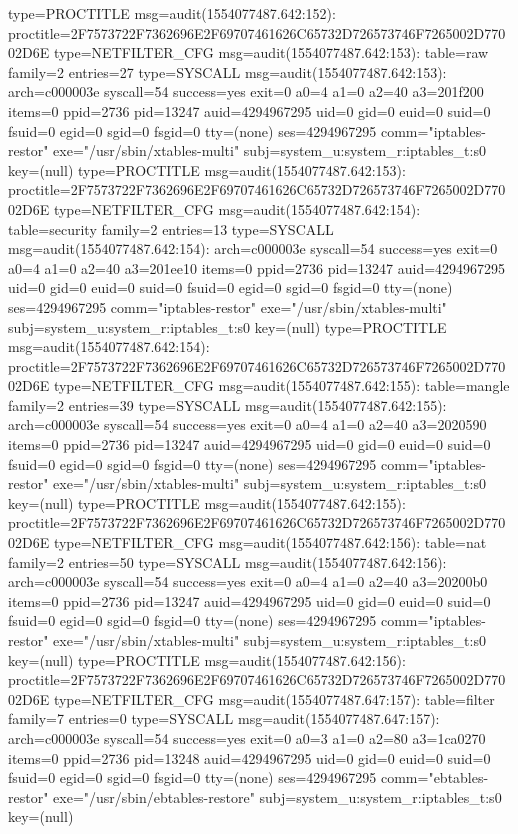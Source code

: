 \documentclass[]{report}
\newenvironment{Shaded}{}{}
\newcommand{\NormalTok}[1]{#1}
\begin{document}
\begin{Shaded}
\begin{Highlighting}[]
\NormalTok{type=PROCTITLE msg=audit(1554077487.642:152): proctitle=2F7573722F7362696E2F69707461626C65732D726573746F7265002D77002D6E}
\NormalTok{type=NETFILTER_CFG msg=audit(1554077487.642:153): table=raw family=2 entries=27}
\NormalTok{type=SYSCALL msg=audit(1554077487.642:153): arch=c000003e syscall=54 success=yes exit=0 a0=4 a1=0 a2=40 a3=201f200 items=0 ppid=2736 pid=13247 auid=4294967295 uid=0 gid=0 euid=0 suid=0 fsuid=0 egid=0 sgid=0 fsgid=0 tty=(none) ses=4294967295 comm="iptables-restor" exe="/usr/sbin/xtables-multi" subj=system_u:system_r:iptables_t:s0 key=(null)}
\NormalTok{type=PROCTITLE msg=audit(1554077487.642:153): proctitle=2F7573722F7362696E2F69707461626C65732D726573746F7265002D77002D6E}
\NormalTok{type=NETFILTER_CFG msg=audit(1554077487.642:154): table=security family=2 entries=13}
\NormalTok{type=SYSCALL msg=audit(1554077487.642:154): arch=c000003e syscall=54 success=yes exit=0 a0=4 a1=0 a2=40 a3=201ee10 items=0 ppid=2736 pid=13247 auid=4294967295 uid=0 gid=0 euid=0 suid=0 fsuid=0 egid=0 sgid=0 fsgid=0 tty=(none) ses=4294967295 comm="iptables-restor" exe="/usr/sbin/xtables-multi" subj=system_u:system_r:iptables_t:s0 key=(null)}
\NormalTok{type=PROCTITLE msg=audit(1554077487.642:154): proctitle=2F7573722F7362696E2F69707461626C65732D726573746F7265002D77002D6E}
\NormalTok{type=NETFILTER_CFG msg=audit(1554077487.642:155): table=mangle family=2 entries=39}
\NormalTok{type=SYSCALL msg=audit(1554077487.642:155): arch=c000003e syscall=54 success=yes exit=0 a0=4 a1=0 a2=40 a3=2020590 items=0 ppid=2736 pid=13247 auid=4294967295 uid=0 gid=0 euid=0 suid=0 fsuid=0 egid=0 sgid=0 fsgid=0 tty=(none) ses=4294967295 comm="iptables-restor" exe="/usr/sbin/xtables-multi" subj=system_u:system_r:iptables_t:s0 key=(null)}
\NormalTok{type=PROCTITLE msg=audit(1554077487.642:155): proctitle=2F7573722F7362696E2F69707461626C65732D726573746F7265002D77002D6E}
\NormalTok{type=NETFILTER_CFG msg=audit(1554077487.642:156): table=nat family=2 entries=50}
\NormalTok{type=SYSCALL msg=audit(1554077487.642:156): arch=c000003e syscall=54 success=yes exit=0 a0=4 a1=0 a2=40 a3=20200b0 items=0 ppid=2736 pid=13247 auid=4294967295 uid=0 gid=0 euid=0 suid=0 fsuid=0 egid=0 sgid=0 fsgid=0 tty=(none) ses=4294967295 comm="iptables-restor" exe="/usr/sbin/xtables-multi" subj=system_u:system_r:iptables_t:s0 key=(null)}
\NormalTok{type=PROCTITLE msg=audit(1554077487.642:156): proctitle=2F7573722F7362696E2F69707461626C65732D726573746F7265002D77002D6E}
\NormalTok{type=NETFILTER_CFG msg=audit(1554077487.647:157): table=filter family=7 entries=0}
\NormalTok{type=SYSCALL msg=audit(1554077487.647:157): arch=c000003e syscall=54 success=yes exit=0 a0=3 a1=0 a2=80 a3=1ca0270 items=0 ppid=2736 pid=13248 auid=4294967295 uid=0 gid=0 euid=0 suid=0 fsuid=0 egid=0 sgid=0 fsgid=0 tty=(none) ses=4294967295 comm="ebtables-restor" exe="/usr/sbin/ebtables-restore" subj=system_u:system_r:iptables_t:s0 key=(null)}

\end{Highlighting}
\end{Shaded}
\end{document}
